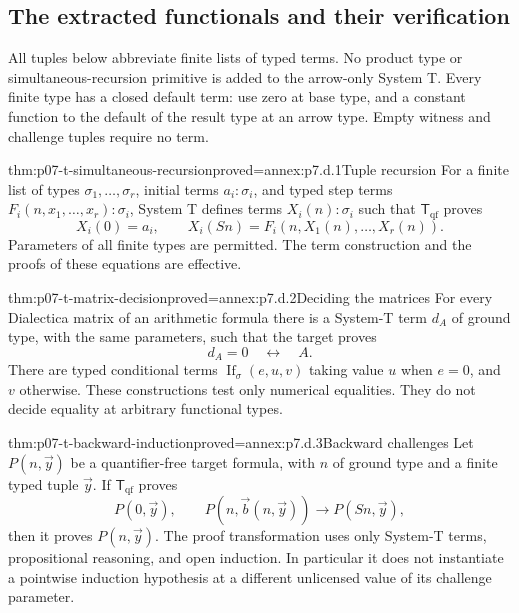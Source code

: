 \subsection{The extracted functionals and their verification}
\label{sec:p07-dialectica-proof}

All tuples below abbreviate finite lists of typed terms. No product
type or simultaneous-recursion primitive is added to the arrow-only
System T. Every finite type has a closed default term: use zero at
base type, and a constant function to the default of the result type
at an arrow type. Empty witness and challenge tuples require no term.

\begin{hblemma}{thm:p07-t-simultaneous-recursion}{proved=annex:p7.d.1}{Tuple recursion}
For a finite list of types \(\sigma_1,\ldots,\sigma_r\), initial
terms \(a_i:\sigma_i\), and typed step terms
\(F_i(n,x_1,\ldots,x_r):\sigma_i\), System T defines terms
\(X_i(n):\sigma_i\) such that \(\mathsf T_{\mathrm{qf}}\) proves
\[
 X_i(0)=a_i,\qquad
 X_i(Sn)=F_i(n,X_1(n),\ldots,X_r(n)).
\]
Parameters of all finite types are permitted. The term construction
and the proofs of these equations are effective.
\end{hblemma}

\begin{hblemma}{thm:p07-t-matrix-decision}{proved=annex:p7.d.2}{Deciding the matrices}
For every Dialectica matrix of an arithmetic formula there is a
System-T term \(d_A\) of ground type, with the same parameters,
such that the target proves
\[
 d_A=0\quad\longleftrightarrow\quad A.
\]
There are typed conditional terms
\(\operatorname{If}_\sigma(e,u,v)\) taking value \(u\) when
\(e=0\), and \(v\) otherwise. These constructions test only
numerical equalities. They do not decide equality at arbitrary
functional types.
\end{hblemma}

\begin{hblemma}{thm:p07-t-backward-induction}{proved=annex:p7.d.3}{Backward challenges}
Let \(P(n,\vec y)\) be a quantifier-free target formula, with
\(n\) of ground type and a finite typed tuple \(\vec y\).
If \(\mathsf T_{\mathrm{qf}}\) proves
\[
 P(0,\vec y),\qquad
 P(n,\vec b(n,\vec y))\longrightarrow P(Sn,\vec y),
\]
then it proves \(P(n,\vec y)\). The proof transformation uses only
System-T terms, propositional reasoning, and open induction. In
particular it does not instantiate a pointwise induction hypothesis
at a different unlicensed value of its challenge parameter.
\end{hblemma}

